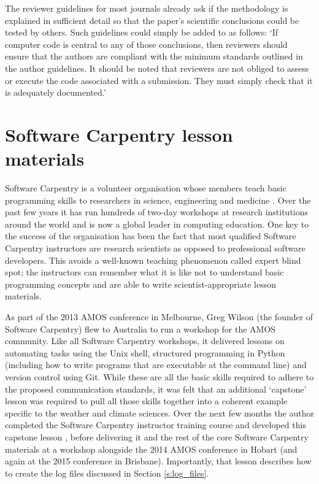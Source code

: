 The reviewer guidelines for most journals already ask if the methodology is explained in sufficient detail so that the paper's scientific conclusions could be tested by others. Such guidelines could simply be added to as follows: `If computer code is central to any of those conclusions, then reviewers should ensure that the authors are compliant with the minimum standards outlined in the author guidelines. It should be noted that reviewers are not obliged to assess or execute the code associated with a submission. They must simply check that it is adequately documented.'   



\section{Software Carpentry lesson materials}\label{s:reproducibility_lessons}

Software Carpentry is a volunteer organisation whose members teach basic programming skills to researchers in science, engineering and medicine \citep{Wilson2014}. Over the past few years it has run hundreds of two-day workshops at research institutions around the world and is now a global leader in computing education. One key to the success of the organisation has been the fact that most qualified Software Carpentry instructors are research scientists as opposed to professional software developers. This avoids a well-known teaching phenomenon called expert blind spot; the instructors can remember what it is like not to understand basic programming concepts and are able to write scientist-appropriate lesson materials.

As part of the 2013 AMOS conference in Melbourne, Greg Wilson (the founder of Software Carpentry) flew to Australia to run a workshop for the AMOS community. Like all Software Carpentry workshops, it delivered lessons on automating tasks using the Unix shell, structured programming in Python (including how to write programs that are executable at the command line) and version control using Git. While these are all the basic skills required to adhere to the proposed communication standards, it was felt that an additional `capstone' lesson was required to pull all those skills together into a coherent example specific to the weather and climate sciences. Over the next few months the author completed the Software Carpentry instructor training course and developed this capstone lesson \citep{IrvingSWC2015}, before delivering it and the rest of the core Software Carpentry materials at a workshop alongside the 2014 AMOS conference in Hobart (and again at the 2015 conference in Brisbane). Importantly, that lesson describes how to create the log files discussed in Section \ref{s:log_files}. 



